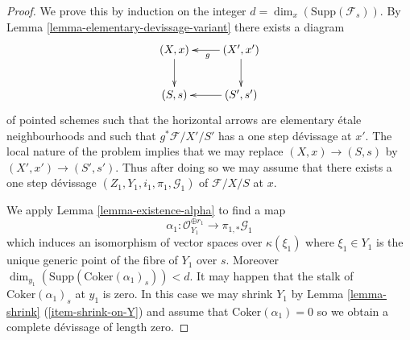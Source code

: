 \begin{proof}
We prove this by induction on the integer
$d = \dim_x(\text{Supp}(\mathcal{F}_s))$.
By
Lemma \ref{lemma-elementary-devissage-variant}
there exists a diagram
$$
\xymatrix{
(X, x) \ar[d] & (X', x') \ar[l]^g \ar[d] \\
(S, s) & (S', s') \ar[l]
}
$$
of pointed schemes such that the horizontal
arrows are elementary \'etale neighbourhoods
and such that $g^*\mathcal{F}/X'/S'$ has a one step d\'evissage at $x'$.
The local nature of the problem implies that we may replace
$(X, x) \to (S, s)$ by $(X', x') \to (S', s')$. Thus after doing so
we may assume that there exists a one step d\'evissage
$(Z_1, Y_1, i_1, \pi_1, \mathcal{G}_1)$ of $\mathcal{F}/X/S$ at $x$.

\medskip\noindent
We apply
Lemma \ref{lemma-existence-alpha}
to find a map
$$
\alpha_1 :
\mathcal{O}_{Y_1}^{\oplus r_1}
\longrightarrow
\pi_{1, *}\mathcal{G}_1
$$
which induces an isomorphism of vector spaces over $\kappa(\xi_1)$
where $\xi_1 \in Y_1$ is the unique generic point of the fibre of
$Y_1$ over $s$. Moreover
$\dim_{y_1}(\text{Supp}(\text{Coker}(\alpha_1)_{s})) < d$.
It may happen that the stalk of $\text{Coker}(\alpha_1)_{s}$
at $y_1$ is zero. In this case we may shrink $Y_1$ by
Lemma \ref{lemma-shrink} (\ref{item-shrink-on-Y})
and assume that $\text{Coker}(\alpha_1) = 0$ so we obtain a
complete d\'evissage of length zero.


\end{proof}
